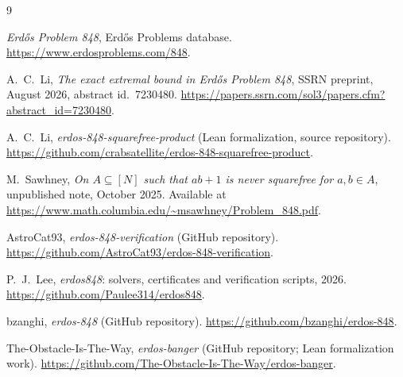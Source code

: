 \documentclass[11pt,a4paper]{article}
\theoremstyle{plain}
\theoremstyle{definition}
\theoremstyle{remark}
\begin{document}
\begin{thebibliography}{9}

\emph{Erd\H{o}s Problem 848}, Erd\H{o}s Problems database.
\url{https://www.erdosproblems.com/848}.

A.~C.~Li,
\emph{The exact extremal bound in Erd\H{o}s Problem 848},
SSRN preprint, August 2026, abstract id.~7230480.
\url{https://papers.ssrn.com/sol3/papers.cfm?abstract_id=7230480}.

A.~C.~Li,
\emph{erdos-848-squarefree-product} (Lean formalization, source repository).
\url{https://github.com/crabsatellite/erdos-848-squarefree-product}.

M.~Sawhney,
\emph{On $A\subseteq[N]$ such that $ab+1$ is never squarefree for $a,b\in A$},
unpublished note, October 2025.
Available at \url{https://www.math.columbia.edu/~msawhney/Problem_848.pdf}.

AstroCat93,
\emph{erdos-848-verification} (GitHub repository).
\url{https://github.com/AstroCat93/erdos-848-verification}.

P.~J.~Lee,
\emph{erdos848}: solvers, certificates and verification scripts, 2026.
\url{https://github.com/Paulee314/erdos848}.

bzanghi,
\emph{erdos-848} (GitHub repository).
\url{https://github.com/bzanghi/erdos-848}.

The-Obstacle-Is-The-Way,
\emph{erdos-banger} (GitHub repository; Lean formalization work).
\url{https://github.com/The-Obstacle-Is-The-Way/erdos-banger}.

\end{thebibliography}
\end{document}
